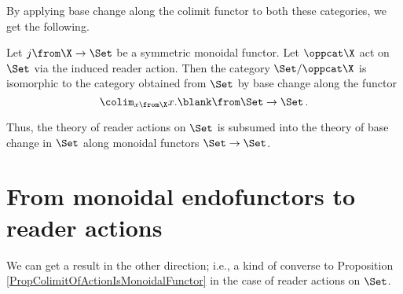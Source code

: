 By applying base change along the colimit functor to both these categories, we get the following.

\begin{corollary}
  Let $j\from \X \to \Set$ be a symmetric monoidal functor.  
  Let $\oppcat\X$ act on $\Set$ via the induced reader action.  
  Then the category $\Set/\oppcat\X$ is isomorphic to the category obtained from $\Set$ by base change along the functor
  \[
    \colim_{x\from \X} x.\blank \from \Set \to \Set\,.
    \]
  \label{CorCxVsBaseChange}
\end{corollary}

Thus, the theory of reader actions on $\Set$ is subsumed into the theory of base change in $\Set$ along monoidal functors $\Set \to \Set$.

\section{From monoidal endofunctors to reader actions}

We can get a result in the other direction; i.e., a kind of converse to Proposition \ref{PropColimitOfActionIsMonoidalFunctor} in the case of reader actions on $\Set$.

